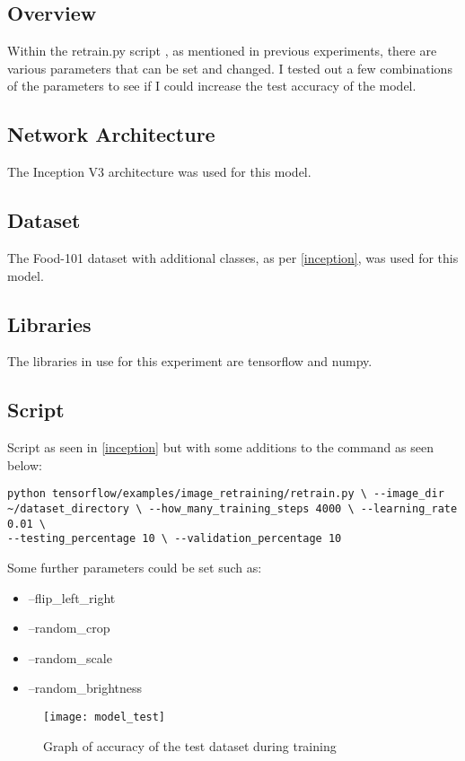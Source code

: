 \subsection*{Overview}
Within the retrain.py script \textcite{retrainInception}, as mentioned in
previous experiments, there are various parameters that can be set and changed.
I tested out a few combinations of the parameters to see if I could increase the
test accuracy of the model.

\subsection*{Network Architecture}
The Inception V3 architecture was used for this model.

\subsection*{Dataset}
The Food-101 dataset \textcite{food101} with additional classes, as per
\ref{inception}, was used for this model.

\subsection*{Libraries}
The libraries in use for this experiment are tensorflow and numpy.

\subsection*{Script}
Script as seen in \ref{inception} but with some additions to the command as seen
below:

\begin{lstlisting}
python tensorflow/examples/image_retraining/retrain.py \ --image_dir
~/dataset_directory \ --how_many_training_steps 4000 \ --learning_rate 0.01 \
--testing_percentage 10 \ --validation_percentage 10
\end{lstlisting}

Some further parameters could be set such as:
\begin{itemize}
	\item{--flip\_left\_right}
	\item{--random\_crop}
	\item{--random\_scale}
	\item{--random\_brightness}
\end{itemize}

\begin{figure}
    \texttt{[image: model\_test]}
     \caption{Graph of accuracy of the test dataset during training}
     \label{fig:model_train_test}
\end{figure}

